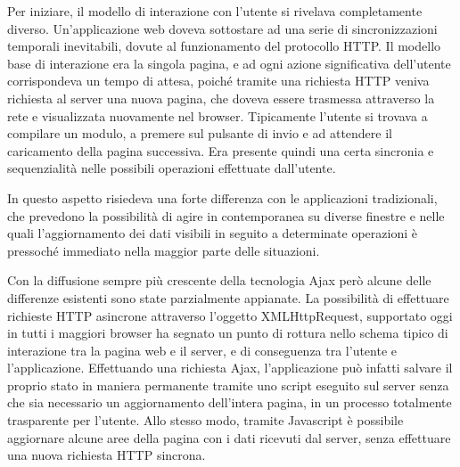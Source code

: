 Per iniziare, il modello di interazione con l'utente si rivelava completamente diverso. Un'applicazione web doveva sottostare ad una serie di sincronizzazioni temporali inevitabili, dovute al funzionamento del protocollo HTTP. Il modello base di interazione era la singola pagina, e ad ogni azione significativa dell'utente corrispondeva un tempo di attesa, poiché tramite una richiesta HTTP veniva richiesta al server una nuova pagina, che doveva essere trasmessa attraverso la rete e visualizzata nuovamente nel browser. Tipicamente l'utente si trovava a compilare un modulo, a premere sul pulsante di invio e ad attendere il caricamento della pagina successiva. Era presente quindi una certa sincronia e sequenzialità nelle possibili operazioni effettuate dall'utente. 

In questo aspetto risiedeva una forte differenza con le applicazioni tradizionali, che prevedono la possibilità di agire in contemporanea su diverse finestre e nelle quali l'aggiornamento dei dati visibili in seguito a determinate operazioni è pressoché immediato nella maggior parte delle situazioni.

Con la diffusione sempre più crescente della tecnologia Ajax però alcune delle differenze esistenti sono state parzialmente appianate. La possibilità di effettuare richieste HTTP asincrone attraverso l'oggetto XMLHttpRequest, supportato oggi in tutti i maggiori browser ha segnato un punto di rottura nello schema tipico di interazione tra la pagina web e il server, e di conseguenza tra l'utente e l'applicazione. Effettuando una richiesta Ajax, l'applicazione può infatti salvare il proprio stato in maniera permanente tramite uno script eseguito sul server senza che sia necessario un aggiornamento dell'intera pagina, in un processo totalmente trasparente per l'utente. Allo stesso modo, tramite Javascript è possibile aggiornare alcune aree della pagina con i dati ricevuti dal server, senza effettuare una nuova richiesta HTTP sincrona.

